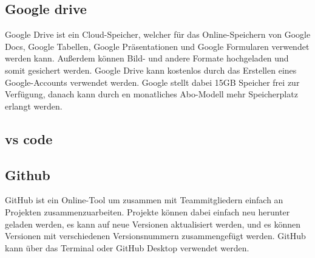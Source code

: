 \subsection{Google drive}
Google Drive ist ein Cloud-Speicher, welcher für das Online-Speichern von Google Docs, Google Tabellen, Google Präsentationen und Google Formularen verwendet werden kann. Außerdem können Bild- und andere Formate hochgeladen und somit gesichert werden. Google Drive kann kostenlos durch das Erstellen eines Google-Accounts verwendet werden. Google stellt dabei 15GB Speicher frei zur Verfügung, danach kann durch en monatliches Abo-Modell mehr Speicherplatz erlangt werden.  

\subsection{vs code}

\subsection{Github}
GitHub ist ein Online-Tool um zusammen mit Teammitgliedern einfach an Projekten zusammenzuarbeiten. Projekte können dabei einfach neu herunter geladen werden, es kann auf neue Versionen aktualisiert werden, und es können Versionen mit verschiedenen Versionsnummern zusammengefügt werden. GitHub kann über das Terminal oder GitHub Desktop verwendet werden. 
